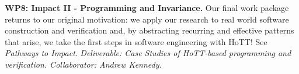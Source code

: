 \documentclass[a4paper,11pt]{article}
\begin{document}






{\bf WP8: Impact II - Programming and Invariance.} %
Our final work package returns to our original motivation:
we apply our research to real world software construction and
verification and, by abstracting recurring and effective patterns that
arise, we take the first steps in software engineering with HoTT! See {\em Pathways to
  Impact}. {\em Deliverable: Case Studies of HoTT-based programming
  and verification. Collaborator: Andrew Kennedy.}
\end{document}
